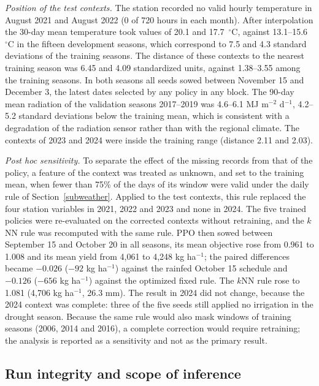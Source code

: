 \documentclass[times,final,authoryear]{elsarticle}
\begin{document}
\emph{Position of the test contexts.} The station recorded no valid hourly temperature in August 2021 and August 2022 (0 of 720 hours in each month). After interpolation the 30-day mean temperature took values of 20.1 and 17.7~$^{\circ}$C, against 13.1--15.6~$^{\circ}$C in the fifteen development seasons, which correspond to 7.5 and 4.3 standard deviations of the training seasons. The distance of these contexts to the nearest training season was 6.45 and 4.09 standardized units, against 1.38--3.55 among the training seasons. In both seasons all seeds sowed between November 15 and December 3, the latest dates selected by any policy in any block. The 90-day mean radiation of the validation seasons 2017--2019 was 4.6--6.1 MJ m$^{-2}$ d$^{-1}$, 4.2--5.2 standard deviations below the training mean, which is consistent with a degradation of the radiation sensor rather than with the regional climate. The contexts of 2023 and 2024 were inside the training range (distance 2.11 and 2.03).

\emph{Post hoc sensitivity.} To separate the effect of the missing records from that of the policy, a feature of the context was treated as unknown, and set to the training mean, when fewer than 75\% of the days of its window were valid under the daily rule of Section~\ref{subweather}. Applied to the test contexts, this rule replaced the four station variables in 2021, 2022 and 2023 and none in 2024. The five trained policies were re-evaluated on the corrected contexts without retraining, and the $k$NN rule was recomputed with the same rule. PPO then sowed between September 15 and October 20 in all seasons, its mean objective rose from 0.961 to 1.008 and its mean yield from 4,061 to 4,248 kg ha$^{-1}$; the paired differences became $-0.026$ ($-92$ kg ha$^{-1}$) against the rainfed October 15 schedule and $-0.126$ ($-656$ kg ha$^{-1}$) against the optimized fixed rule. The $k$NN rule rose to 1.081 (4,706 kg ha$^{-1}$, 26.3 mm). The result in 2024 did not change, because the 2024 context was complete: three of the five seeds still applied no irrigation in the drought season. Because the same rule would also mask windows of training seasons (2006, 2014 and 2016), a complete correction would require retraining; the analysis is reported as a sensitivity and not as the primary result.

\subsection{Run integrity and scope of inference}
\label{subres_generalization}
\end{document}

